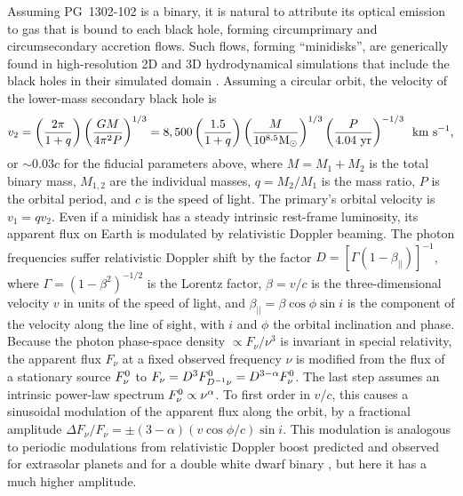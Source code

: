 Assuming PG~1302-102 is a binary, it is natural to attribute its
optical emission to gas that is bound to each black hole, forming
circumprimary and circumsecondary accretion flows. Such flows, forming
``minidisks'', are generically found in high-resolution 2D and 3D
hydrodynamical simulations that include the black holes in their
simulated
domain \cite{Hayasaki+2008,ShiKrolik:2012,Roedig:2012:Trqs,DHM:2013:MNRAS,NixonKing:Tear:2013,Farris:2014,Dunhill+2015,ShiKrolik:2015}.
Assuming a circular orbit, the velocity of the lower-mass secondary
black hole is
\begin{equation}
\nonumber
v_2= \left(\frac{2\pi}{1+q}\right) \left(\frac{GM}{4\pi^2P}\right)^{1/3} 
=8,500 
\left(\frac{1.5}{1+q}\right) 
\left(\frac{M}{10^{8.5}{\rm M_\odot}}\right)^{1/3}
\left(\frac{P}{4.04~{\rm yr}}\right)^{-1/3} \,\,\, {\rm km~s^{-1}},
\end{equation}
or $\sim 0.03c$ for the fiducial parameters above, where $M=M_1+M_2$
is the total binary mass, $M_{1,2}$ are the individual masses,
$q=M_2/M_1$ is the mass ratio, $P$ is the orbital period, and $c$ is
the speed of light.  The primary's orbital velocity is $v_1=qv_2$.
Even if a minidisk has a steady intrinsic rest-frame luminosity, its
apparent flux on Earth is modulated by relativistic Doppler beaming.
The photon frequencies suffer relativistic Doppler shift by the factor
$D=[\Gamma(1-\beta_{||})]^{-1}$, where $\Gamma=(1-\beta^2)^{-1/2}$ is
the Lorentz factor, $\beta=v/c$ is the three-dimensional velocity $v$
in units of the speed of light, and $\beta_{||}=\beta\cos\phi\sin i$
is the component of the velocity along the line of sight, with $i$ and
$\phi$ the orbital inclination and phase.  Because the photon
phase-space density $\propto F_\nu / \nu^3$ is invariant in special
relativity, the apparent flux $F_\nu$ at a fixed observed frequency
$\nu$ is modified from the flux of a stationary source $F_\nu^{\rm 0}$
to $F_\nu =D^{3}F^{\rm 0}_{D^{-1}\nu}=D^{3-\alpha}F^{\rm 0}_{\nu}$.
The last step assumes an intrinsic power-law spectrum $F^{\rm
  0}_{\nu}\propto \nu^{\alpha}$.  To first order in $v/c$, this causes
a sinusoidal modulation of the apparent flux along the orbit, by a
fractional amplitude $\Delta F_\nu/F_\nu = \pm
(3-\alpha)(v\cos\phi/c)\sin i$.  This modulation is analogous to
periodic modulations from relativistic Doppler boost
predicted \cite{LoebGaudi2003} and observed for extrasolar
planets \cite{Kerkwijk+2010,MH2010} and for a double white dwarf
binary \cite{Shporer+2010}, but here it has a much higher amplitude.


